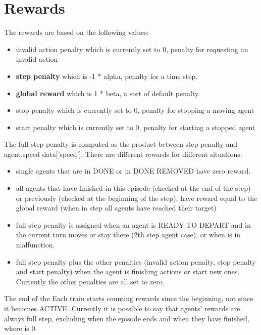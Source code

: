 \section{Rewards}
\label{sec:envRewards}
The rewards are based on the following values:
\begin{itemize}
\item invalid action penalty which is currently set to 0, penalty for requesting an invalid action
\item \textbf{step penalty} which is -1 * alpha, penalty for a time step.
\item \textbf{global reward} which is 1 * beta, a sort of default penalty.
\item stop penalty which is currently set to 0, penalty for stopping a moving agent
\item start penalty which is currently set to 0, penalty for starting a stopped agent
\end{itemize}
The full step penalty is computed as the product between step penalty and
agent.speed data[’speed’]. There are different rewards for different situations:
\begin{itemize}	
\item single agents that are in DONE or in DONE REMOVED have zero reward.
\item all agents that have finished in this episode (checked at the end of the step) or previously (checked at the beginning of the step), have reward equal to the global reward (when in step all agents have reached their target)
\item full step penalty is assigned when an agent is READY TO DEPART and in the current turn moves or stay there (2th step agent case), or when is in malfunction.
\item full step penalty plus the other penalties (invalid action penalty, stop penalty and start penalty) when the agent is finishing actions or start new ones. Currently the other penalties are all set to zero.
\end{itemize}
The end of the Each train starts counting rewards since the beginning, not since it becomes ACTIVE. Currently it is possible to say that agents’ rewards are always full step, excluding when the episode ends and when they have finished, where is 0.

